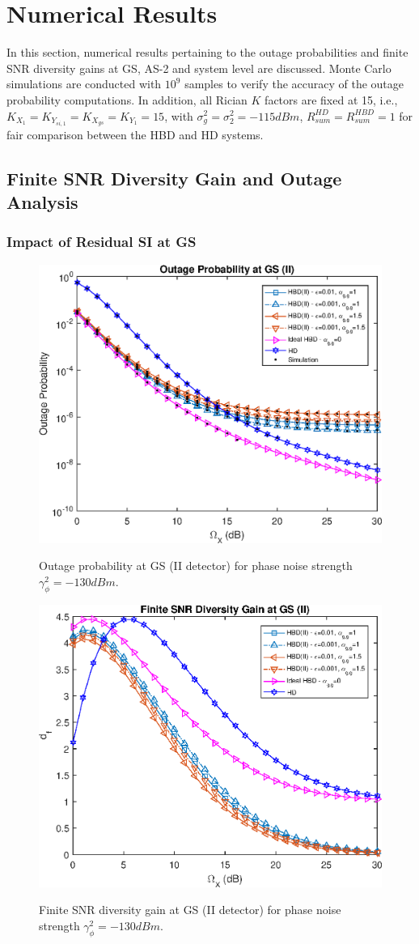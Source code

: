 \section{Numerical Results} \label{section:num_results}

In this section, numerical results pertaining to the outage probabilities and finite SNR diversity gains at GS, AS-2 and system level are discussed. Monte Carlo simulations are conducted with $10^{9}$ samples to verify the accuracy of the outage probability computations. In addition, all Rician $K$ factors are fixed at 15, i.e., $K_{X_1}=K_{Y_{si,1}}=K_{X_{gs}}=K_{Y_1}=15$, with $\sigma_g^2 = \sigma_2^2=-115dBm$, $R_{sum}^{HD}=R_{sum}^{HBD}=1$ for fair comparison between the HBD and HD systems.

\subsection{Finite SNR Diversity Gain and Outage Analysis}
\subsubsection{Impact of Residual SI at GS}

\begin{figure}[]
\centering
\includegraphics [width=0.6\columnwidth]{chap4_fig/fixed_pout_gs.eps}
\label{fig:fixed_pout_gs}
\caption{Outage probability at GS (II detector) for phase noise strength $\gamma_{\phi}^2=-130dBm$.}
\end{figure}

\begin{figure}[]
\centering
\includegraphics [width=0.6\columnwidth]{chap4_fig/fixed_df_gs.eps}
\label{fig:fixed_df_gs}
\caption{Finite SNR diversity gain at GS (II detector) for phase noise strength $\gamma_{\phi}^2=-130dBm$.}
\end{figure}

